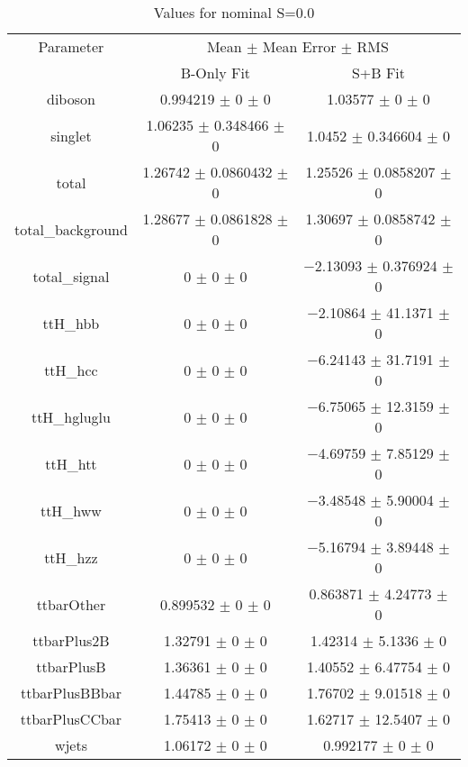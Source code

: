\begin{table}
\centering
\caption{Values for nominal S=0.0}
\begin{tabular}{ccc}
\toprule
Parameter & \multicolumn{2}{c}{Mean $\pm$ Mean Error $\pm$ RMS}\\
 & B-Only Fit & S+B Fit\\
\midrule
diboson & \num{0.994219} $\pm$ \num{0} $\pm$ \num{0} & \num{1.03577} $\pm$ \num{0} $\pm$ \num{0}\\
singlet & \num{1.06235} $\pm$ \num{0.348466} $\pm$ \num{0} & \num{1.0452} $\pm$ \num{0.346604} $\pm$ \num{0}\\
total & \num{1.26742} $\pm$ \num{0.0860432} $\pm$ \num{0} & \num{1.25526} $\pm$ \num{0.0858207} $\pm$ \num{0}\\
total\_background & \num{1.28677} $\pm$ \num{0.0861828} $\pm$ \num{0} & \num{1.30697} $\pm$ \num{0.0858742} $\pm$ \num{0}\\
total\_signal & \num{0} $\pm$ \num{0} $\pm$ \num{0} & \num{-2.13093} $\pm$ \num{0.376924} $\pm$ \num{0}\\
ttH\_hbb & \num{0} $\pm$ \num{0} $\pm$ \num{0} & \num{-2.10864} $\pm$ \num{41.1371} $\pm$ \num{0}\\
ttH\_hcc & \num{0} $\pm$ \num{0} $\pm$ \num{0} & \num{-6.24143} $\pm$ \num{31.7191} $\pm$ \num{0}\\
ttH\_hgluglu & \num{0} $\pm$ \num{0} $\pm$ \num{0} & \num{-6.75065} $\pm$ \num{12.3159} $\pm$ \num{0}\\
ttH\_htt & \num{0} $\pm$ \num{0} $\pm$ \num{0} & \num{-4.69759} $\pm$ \num{7.85129} $\pm$ \num{0}\\
ttH\_hww & \num{0} $\pm$ \num{0} $\pm$ \num{0} & \num{-3.48548} $\pm$ \num{5.90004} $\pm$ \num{0}\\
ttH\_hzz & \num{0} $\pm$ \num{0} $\pm$ \num{0} & \num{-5.16794} $\pm$ \num{3.89448} $\pm$ \num{0}\\
ttbarOther & \num{0.899532} $\pm$ \num{0} $\pm$ \num{0} & \num{0.863871} $\pm$ \num{4.24773} $\pm$ \num{0}\\
ttbarPlus2B & \num{1.32791} $\pm$ \num{0} $\pm$ \num{0} & \num{1.42314} $\pm$ \num{5.1336} $\pm$ \num{0}\\
ttbarPlusB & \num{1.36361} $\pm$ \num{0} $\pm$ \num{0} & \num{1.40552} $\pm$ \num{6.47754} $\pm$ \num{0}\\
ttbarPlusBBbar & \num{1.44785} $\pm$ \num{0} $\pm$ \num{0} & \num{1.76702} $\pm$ \num{9.01518} $\pm$ \num{0}\\
ttbarPlusCCbar & \num{1.75413} $\pm$ \num{0} $\pm$ \num{0} & \num{1.62717} $\pm$ \num{12.5407} $\pm$ \num{0}\\
wjets & \num{1.06172} $\pm$ \num{0} $\pm$ \num{0} & \num{0.992177} $\pm$ \num{0} $\pm$ \num{0}\\
\bottomrule
\end{tabular}
\end{table}